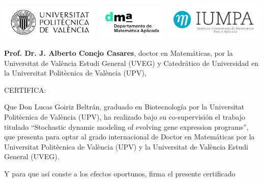 \documentclass[11pt]{book}
\theoremstyle{definition}
\begin{document}
\vfill

\pagebreak ~

\chapter*{}
\vspace{-4cm}

\begin{flushright}
\includegraphics[width=0.36\textwidth]{assets/upv_logo.png}
\includegraphics[width=0.26\textwidth]{assets/dma_logo.jpg}
\includegraphics[width=0.36\textwidth]{assets/iumpa_logo.jpeg}
\end{flushright}

\vspace{0.5cm}

\noindent\textbf{Prof. Dr. J. Alberto Conejo Casares}, doctor en Matemáticas, por la Universitat de València Estudi General (UVEG) y Catedrático de Universidad en la Universitat Politècnica de València (UPV),

\vspace{1.5cm}

CERTIFICA:

\vspace{1.5cm}

\noindent Que Don Lucas Goiriz Beltrán, graduado en Biotecnología por la Universitat Politècnica de València (UPV), ha realizado bajo su co-supervisión el trabajo titulado
``Stochastic dynamic modeling of evolving gene expression programs'', que presenta para optar al grado internacional de Doctor en Matemáticas por la Universitat Politècnica de València (UPV) y la Universitat de València Estudi General (UVEG).

\vspace{1cm}

Y para que así conste a los efectos oportunos, firma el presente certificado
\end{document}
